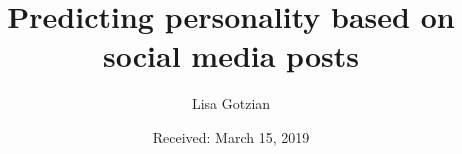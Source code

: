 %
%
\RequirePackage{fix-cm}
%
\documentclass[smallextended]{svjour3}       %
%
\smartqed  %
%
\usepackage{graphicx}
\usepackage{caption} %
\usepackage{subcaption} %
\usepackage{setspace, amsmath}
\usepackage{etoolbox} %

\newcommand{\comm}[1]{}
%
%
%
%
%


\title{Predicting personality based on social media posts
}


\author{Lisa Gotzian 
}


\date{Received: March 15, 2019}


\maketitle


